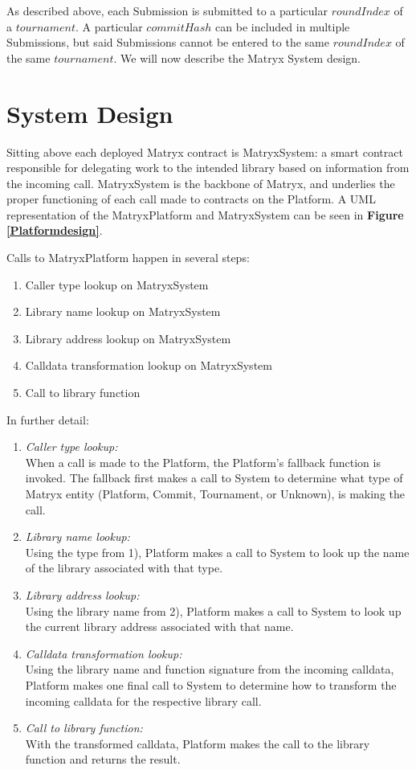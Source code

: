 \documentclass[a4paper, 10pt, conference]{ieeeconf}      %
\begin{document}
As described above, each Submission is submitted to a particular $roundIndex$ of a $tournament$. A particular $commitHash$ can be included in multiple Submissions, but said Submissions cannot be entered to the same $roundIndex$ of the same $tournament$.
We will now describe the Matryx System design.

\section{System Design}\label{systemdesign}

Sitting above each deployed Matryx contract is MatryxSystem: a smart contract responsible for delegating work to the intended library based on information from the incoming call. 
MatryxSystem is the backbone of Matryx, and underlies the proper functioning of each call made to contracts on the Platform. A UML representation of the MatryxPlatform and MatryxSystem can be seen in \textbf{Figure \ref{Platformdesign}}.

\bigskip
Calls to MatryxPlatform happen in several steps:
\begin{enumerate}
    \item Caller type lookup on MatryxSystem
    \item Library name lookup on MatryxSystem
    \item Library address lookup on MatryxSystem
    \item Calldata transformation lookup on MatryxSystem
    \item Call to library function
\end{enumerate}
\bigskip

In further detail:

\begin{enumerate}
    \item \textit{Caller type lookup:} \\ When a call is made to the Platform, the Platform’s fallback function is invoked. The fallback first makes a call to System to determine what type of Matryx entity (Platform, Commit, Tournament, or Unknown), is making the call.
    \item \textit{Library name lookup:} \\ Using the type from 1), Platform makes a call to System to look up the name of the library associated with that type.
    \item \textit{Library address lookup:} \\ Using the library name from 2), Platform makes a call to System to look up the current library address associated with that name.
    \item \textit{Calldata transformation lookup:} \\ Using the library name and function signature from the incoming calldata, Platform makes one final call to System to determine how to transform the incoming calldata for the respective library call.
    \item \textit{Call to library function:} \\ With the transformed calldata, Platform makes the call to the library function and returns the result.
\end{enumerate}
\end{document}
